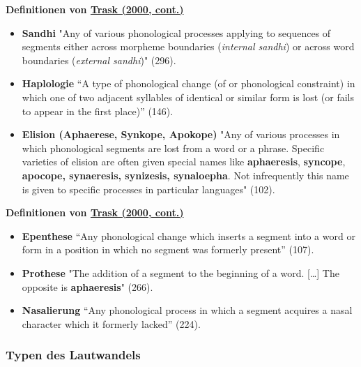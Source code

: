 \vspace{0.5cm}\par\noindent\textbf{Definitionen von\vspace{0.5cm}
\href{http://bibliography.lingpy.org?key=Trask2000}{Trask (2000,
cont.)}}

\begin{itemize}
\itemsep1pt\parskip0pt
\item
  \textbf{Sandhi} "Any of various phonological processes applying to
  sequences of segments either across morpheme boundaries
  (\emph{internal sandhi}) or across word boundaries (\emph{external
  sandhi})" (296).
\item
  \textbf{Haplologie} ``A type of phonological change (of or
  phonological constraint) in which one of two adjacent syllables of
  identical or similar form is lost (or fails to appear in the first
  place)'' (146).
\item
  \textbf{Elision (Aphaerese, Synkope, Apokope)} "Any of various
  processes in which phonological segments are lost from a word or a
  phrase. Specific varieties of elision are often given special names
  like \textbf{aphaeresis}, \textbf{syncope}, \textbf{apocope,
  synaeresis, synizesis, synaloepha}. Not infrequently this name is
  given to specific processes in particular languages" (102).
\end{itemize}



\vspace{0.5cm}\par\noindent\textbf{Definitionen von\vspace{0.5cm}
\href{http://bibliography.lingpy.org?key=Trask2000}{Trask (2000,
cont.)}}

\begin{itemize}
\itemsep1pt\parskip0pt
\item
  \textbf{Epenthese} ``Any phonological change which inserts a segment
  into a word or form in a position in which no segment was formerly
  present'' (107).
\item
  \textbf{Prothese} "The addition of a segment to the beginning of a
  word. {[}\ldots{}{]} The opposite is \textbf{aphaeresis}" (266).
\item
  \textbf{Nasalierung} ``Any phonological process in which a segment
  acquires a nasal character which it formerly lacked'' (224).
\end{itemize}

\subsubsection{\texorpdfstring{{Typen des
Lautwandels}}{Typen des Lautwandels}}

